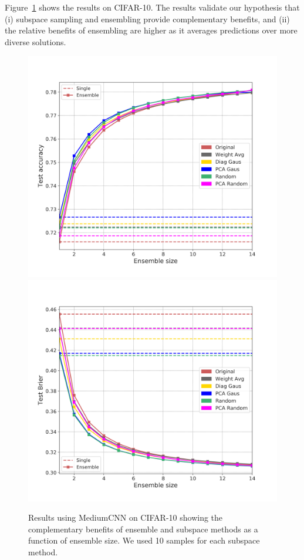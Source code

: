 \documentclass{article}
\newlength{\sfigwidth}
\newlength{\sfigwidthtwo}
\newcommand{\reducespaceafterfigure}{\vspace{-1em}} %
\begin{document}
%
%
%

Figure~\ref{fig:ensemble-subspace-cifar} shows the results on CIFAR-10.  
The results validate our hypothesis that (i) subspace sampling and ensembling  provide complementary benefits, and (ii) the relative benefits of ensembling are higher as it averages predictions over more diverse solutions.  

\begin{figure}[ht]%
    \centering%
    \reducespaceafterfigure
      \includegraphics[width=\sfigwidthtwo]{figures/med_cnn_ens_subspace_acc.png}%
       \includegraphics[width=\sfigwidthtwo]{figures/med_cnn_ens_subspace_brier.png}%
  \reducespaceafterfigure   \caption{
    Results using MediumCNN on CIFAR-10 showing the  complementary benefits of ensemble and subspace methods as a function of ensemble size. We used 10 samples for each subspace method.
    }
    \label{fig:ensemble-subspace-cifar}%
\end{figure}%
\end{document}

